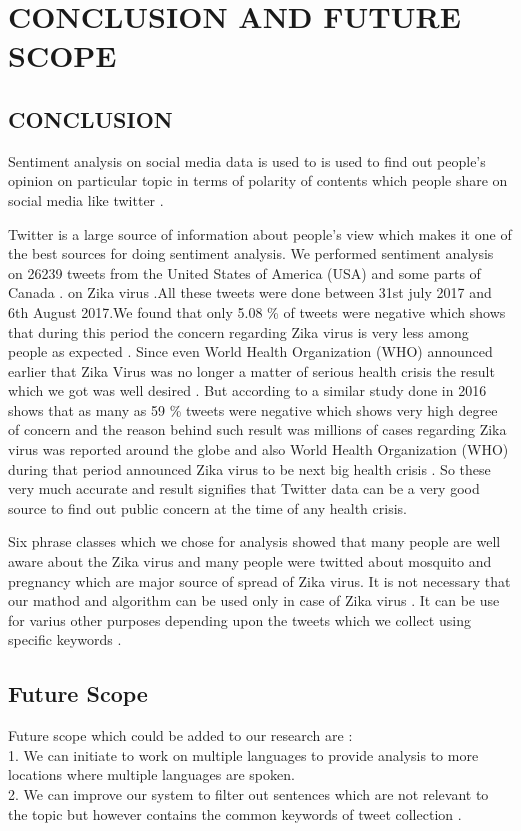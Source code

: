 \chapter{CONCLUSION AND FUTURE SCOPE}
\section{CONCLUSION}
Sentiment analysis on social media data is used to is used to find out people’s opinion on particular topic in terms of polarity of contents which people share on social media like twitter .
\par Twitter is a large source of information about people’s view which makes it one of the best sources for doing sentiment analysis. We performed sentiment analysis on 26239 tweets from the United States of America (USA) and some parts of Canada . on Zika virus .All these tweets were done between 31st july 2017 and 6th August 2017.We found that only 5.08 \% of tweets were negative which shows that during this period the concern regarding Zika virus is very less among people as expected . Since even World Health Organization (WHO) announced earlier that Zika Virus was no longer a matter of serious health crisis the result which we got was well desired . But according to a similar study done in 2016 shows that as many as 59 \% tweets were negative which shows very high degree of concern and the reason behind such result was millions of cases regarding Zika virus was reported around the globe and also World Health Organization (WHO) during that period announced Zika virus to be next big health crisis . So these very much accurate and result signifies that Twitter data can be a very good source to find out public concern at the time of any health crisis.

\par Six phrase classes which we chose for analysis showed that many people are well aware about the Zika virus and many people were twitted about mosquito and pregnancy which are major source of spread of Zika virus.
It is not necessary that our mathod and algorithm can be used only in case of Zika virus . It can be use for varius other purposes depending upon the tweets which we collect using specific keywords .

\section{Future Scope}
Future scope which could be added to our research are :\\

1. We can initiate to work on multiple languages to provide analysis to more locations where multiple languages are spoken.\\
2. We can improve our system to filter out sentences which are not relevant to the topic but however contains the common keywords of tweet collection .

